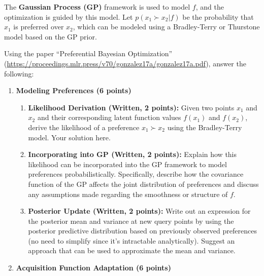 \documentclass[
  letterpaper,
  numbers=noenddot,
  DIV=11]{scrreprt}
\theoremstyle{plain}
\theoremstyle{definition}
\theoremstyle{remark}
\begin{document}
The \textbf{Gaussian Process (GP)} framework is used to model \(f\), and
the optimization is guided by this model. Let \(p(x_1 \succ x_2 | f)\)
be the probability that \(x_1\) is preferred over \(x_2\), which can be
modeled using a Bradley-Terry or Thurstone model based on the GP prior.

Using the paper ``Preferential Bayesian Optimization''
(\url{https://proceedings.mlr.press/v70/gonzalez17a/gonzalez17a.pdf}),
answer the following:

\begin{enumerate}
\def\labelenumi{(\alph{enumi})}
\item
  \textbf{Modeling Preferences (6 points)}

  \begin{enumerate}
  \def\labelenumii{(\roman{enumii})}
  \item
    \textbf{Likelihood Derivation (Written, 2 points):} Given two points
    \(x_1\) and \(x_2\) and their corresponding latent function values
    \(f(x_1)\) and \(f(x_2)\), derive the likelihood of a preference
    \(x_1 \succ x_2\) using the Bradley-Terry model. Your solution here.
  \item
    \textbf{Incorporating into GP (Written, 2 points):} Explain how this
    likelihood can be incorporated into the GP framework to model
    preferences probabilistically. Specifically, describe how the
    covariance function of the GP affects the joint distribution of
    preferences and discuss any assumptions made regarding the
    smoothness or structure of \(f\).
  \item
    \textbf{Posterior Update (Written, 2 points):} Write out an
    expression for the posterior mean and variance at new query points
    by using the posterior predictive distribution based on previously
    observed preferences (no need to simplify since it's intractable
    analytically). Suggest an approach that can be used to approximate
    the mean and variance.
  \end{enumerate}
\item
  \textbf{Acquisition Function Adaptation (6 points)}


\end{enumerate}
\end{document}

